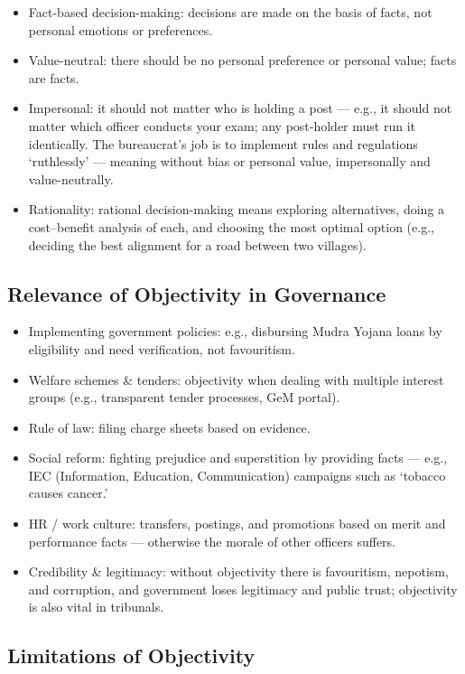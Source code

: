 \begin{itemize}
\item Fact-based decision-making: decisions are made on the basis of facts, not personal emotions or preferences.
\item Value-neutral: there should be no personal preference or personal value; facts are facts.
\item Impersonal: it should not matter who is holding a post --- e.g., it should not matter which officer conducts your exam; any post-holder must run it identically. The bureaucrat's job is to implement rules and regulations `ruthlessly' --- meaning without bias or personal value, impersonally and value-neutrally.
\item Rationality: rational decision-making means exploring alternatives, doing a cost--benefit analysis of each, and choosing the most optimal option (e.g., deciding the best alignment for a road between two villages).
\end{itemize}

\subsection{Relevance of Objectivity in Governance}

\begin{itemize}
\item Implementing government policies: e.g., disbursing Mudra Yojana loans by eligibility and need verification, not favouritism.
\item Welfare schemes \& tenders: objectivity when dealing with multiple interest groups (e.g., transparent tender processes, GeM portal).
\item Rule of law: filing charge sheets based on evidence.
\item Social reform: fighting prejudice and superstition by providing facts --- e.g., IEC (Information, Education, Communication) campaigns such as `tobacco causes cancer.'
\item HR / work culture: transfers, postings, and promotions based on merit and performance facts --- otherwise the morale of other officers suffers.
\item Credibility \& legitimacy: without objectivity there is favouritism, nepotism, and corruption, and government loses legitimacy and public trust; objectivity is also vital in tribunals.
\end{itemize}

\subsection{Limitations of Objectivity}

